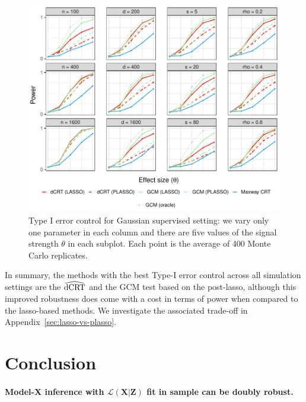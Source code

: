 \documentclass[12pt]{article}
\theoremstyle{definition}
\theoremstyle{remark}
\newcommand{\prx}{\bm X}								%
\newcommand{\prz}{\bm Z}								%
\newcommand{\law}{\mathcal L}							%
\newcommand{\dCRThat}{\widehat{\textnormal{dCRT}}}		%
\begin{document}
	\begin{figure}[h]
		\centering
		\includegraphics[scale = 1]{figures/gaussian_supervised_setting_alternative_partial.pdf}
		\caption{Type I error control for Gaussian supervised setting: we vary only one parameter in each column and there are five values of the signal strength $\theta$ in each subplot. Each point is the average of 400 Monte Carlo replicates.}
		\label{fig:gaussian_supervised_partial_alternative}
\end{figure}

In summary, the methods with the best Type-I error control across all simulation settings are the $\dCRThat$ and the GCM test based on the post-lasso, although this improved robustness does come with a cost in terms of power when compared to the lasso-based methods. We investigate the associated trade-off in Appendix~\ref{sec:lasso-vs-plasso}.

\section{Conclusion} \label{sec:conclusion}

\paragraph{Model-X inference with $\law(\prx|\prz)$ fit in sample can be doubly robust.}
\end{document}
